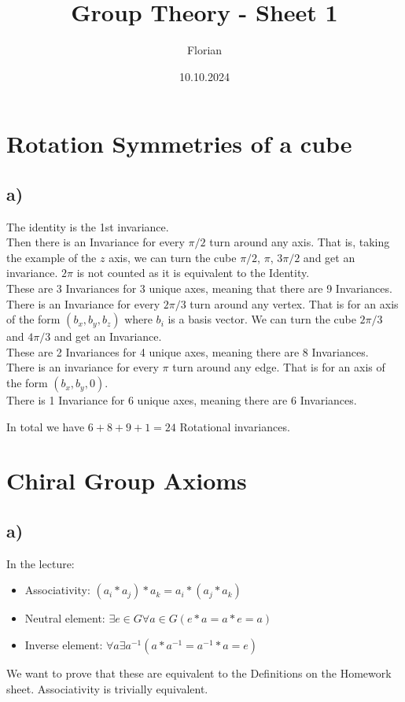 \documentclass[]{scrartcl}
\title{Group Theory - Sheet 1}
\author{Florian}
\date{10.10.2024}
\begin{document}
\maketitle
\newpage
\tableofcontents
\newpage

\section{Rotation Symmetries of a cube}

\subsection{a)}

The identity is the 1st invariance.\\
Then there is an Invariance for every $\pi/2$ turn around any axis. That is, taking the example of the $z$ axis, we can turn the cube $\pi/2$, $\pi$, $3\pi/2$ and get an invariance. $2\pi$ is not counted as it is equivalent to the Identity.\\
These are 3 Invariances for 3 unique axes, meaning that there are 9 Invariances.\\
There is an Invariance for every $2\pi/3$ turn around any vertex. That is for an axis of the form $(b_x, b_y, b_z)$ where $b_i$ is a basis vector. We can turn the cube $2\pi/3$ and $4\pi/3$ and get an Invariance.\\
These are 2 Invariances for 4 unique axes, meaning there are 8 Invariances.\\
There is an invariance for every $\pi$ turn around any edge. That is for an axis of the form $(b_x, b_y, 0)$.\\
There is 1 Invariance for 6 unique axes, meaning there are 6 Invariances.

In total we have $6+8+9+1 = 24$ Rotational invariances.


\section{Chiral Group Axioms}

\subsection{a)}
In the lecture:
\begin{itemize}
	\item Associativity: $(a_i * a_j) * a_k = a_i * (a_j * a_k)$
	\item Neutral element: $\exists e\in G\forall a\in G(e*a = a*e = a)$
	\item Inverse element: $\forall a \exists a^{-1}(a*a^{-1} = a^{-1}*a=e)$
\end{itemize}
We want to prove that these are equivalent to the Definitions on the Homework sheet. Associativity is trivially equivalent.
\end{document}
